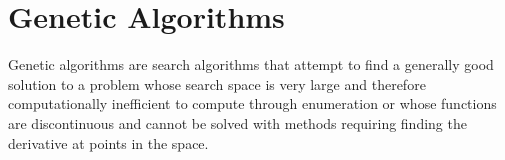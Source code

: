 \section{Genetic Algorithms}
Genetic algorithms are search algorithms that attempt to find a generally good solution to a problem whose search space
is very large and therefore computationally inefficient to compute through enumeration or whose functions are discontinuous and cannot
be solved with methods requiring finding the derivative at points in the space.

